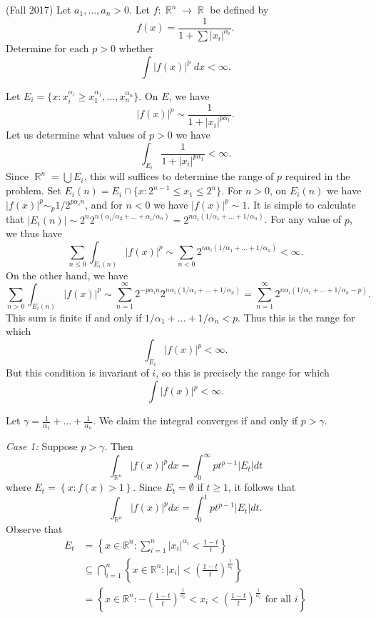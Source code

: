\documentclass{exam}
\DeclareMathOperator{\RR}{\mathbb{R}}
\theoremstyle{problemstyle}
\newcommand{\vt}{\vskip 5mm} %
\newcommand{\1}[1]{\textbf{1}_{\left[#1\right]}} %
\def\R{\mathbb{R}} %
\begin{document}
\begin{questions}
\question (Fall 2017) Let $a_1, \dots, a_n > 0$. Let $f: \RR^n \to \RR$ be defined by
%
\[ f(x) = \frac{1}{1 + \sum |x_i|^{\alpha_i}}. \]
%
Determine for each $p > 0$ whether
%
\[ \int |f(x)|^p\; dx < \infty. \]
\begin{solution}
	Let $E_i = \{ x: x_i^{\alpha_i} \geq x_1^{\alpha_1}, \dots, x_n^{\alpha_n} \}$. On $E$, we have
	\[ |f(x)|^p \sim \frac{1}{1 + |x_i|^{p \alpha_1}}. \]
	Let us determine what values of $p > 0$ we have
	\[ \int_{E_i} \frac{1}{1 + |x_i|^{p \alpha_1}} < \infty.  \]
	Since $\RR^n = \bigcup E_i$, this will suffices to determine the range of $p$ required in the problem. Set $E_i(n) = E_i \cap \{ x : 2^{n-1} \leq x_1 \leq 2^n \}$. For $n > 0$, on $E_i(n)$ we have $|f(x)|^p \sim_p 1/2^{p \alpha_i n}$, and for $n < 0$ we have $|f(x)|^p \sim 1$. It is simple to calculate that $|E_i(n)| \sim 2^n 2^{n(\alpha_i/\alpha_2 + \dots + \alpha_i / \alpha_n)} = 2^{n \alpha_i (1/\alpha_1 + \dots + 1/\alpha_n)}$. For any value of $p$, we thus have
	\[ \sum_{n \leq 0} \int_{E_i(n)} |f(x)|^p \sim \sum_{n < 0} 2^{n \alpha_i (1/\alpha_1 + \dots + 1/\alpha_n)} < \infty. \]
	On the other hand, we have
	\[ \sum_{n > 0} \int_{E_i(n)} |f(x)|^p \sim \sum_{n = 1}^\infty 2^{-p\alpha_i n} 2^{n \alpha_i(1/\alpha_1 + \dots + 1/\alpha_n)} = \sum_{n = 1}^\infty 2^{n \alpha_i(1/\alpha_1 + \dots + 1/\alpha_n -p)}. \]
	This sum is finite if and only if $1/\alpha_1 + \dots + 1/\alpha_n < p$. Thus this is the range for which
	\[ \int_{E_i} |f(x)|^p < \infty. \]
	But this condition is invariant of $i$, so this is precisely the range for which
	\[ \int |f(x)|^p < \infty. \]
\end{solution}

\begin{solution}

Let $\gamma=\frac{1}{\alpha_{1}}+\ldots+\frac{1}{\alpha_{n}}$. We claim the integral converges if and only if $p>\gamma$.

\vt
\textit{Case 1:} Suppose $p>\gamma$. Then
\begin{equation*}
  \int_{\R^{n}} |f(x)|^{p}dx = \int_{0}^{\infty}p t^{p-1}|E_{t}|dt
\end{equation*}
where $E_{t}= \left\{ x: f(x)>1 \right\}$. Since $E_{t}=\emptyset$ if $t\geq 1$, it follows that
\begin{equation}\label{eq:10000}
  \int_{\R^{n}} |f(x)|^{p}dx = \int_{0}^{1}p t^{p-1}|E_{t}|dt.
\end{equation}
Observe that
\begin{align*}
  E_{t}
  &= \left\{ x\in \R^{n} : \sum_{i=1}^{n}|x_{i}|^{\alpha_{i}}< \frac{1-t}{t} \right\} \\
  &\subseteq \bigcap_{i=1}^{n}\left\{ x\in \R^{n}: |x_{i}| < \left(\frac{1-t}{t}\right)^{\frac{1}{\alpha_{i}}} \right\}\\
  &= \left\{ x\in \R^{n}:  -\left(\frac{1-t}{t}\right)^{\frac{1}{\alpha_{i}}} < x_{i}< \left(\frac{1-t}{t}\right)^{\frac{1}{\alpha_{i}}} \text{ for all }i\right\}
\end{align*}


\end{solution}
\end{questions}
\end{document}
